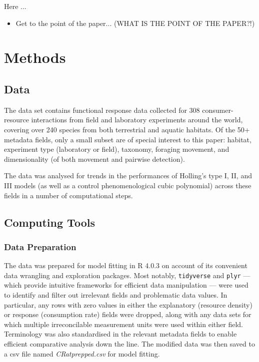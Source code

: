 \documentclass[11pt]{article}
\begin{document}
    Here ...
    \begin{itemize}
      \item Get to the point of the paper... (WHAT IS THE POINT OF THE PAPER?!)
    \end{itemize}
    
    \section{Methods}
    
    \subsection{Data}
    The data set contains functional response data collected for 308 consumer-resource interactions from field and laboratory experiments around the world, covering over 240 species from both terrestrial and aquatic habitats. Of the 50+ metadata fields, only a small subset are of special interest to this paper: habitat, experiment type (laboratory or field), taxonomy, foraging movement, and dimensionality (of both movement and pairwise detection).
    
    The data was analysed for trends in the performances of Holling's type I, II, and III models (as well as a control phenomenological cubic polynomial) across these fields in a number of computational steps.
    
    \subsection{Computing Tools}
    
    \subsubsection{Data Preparation}
    The data was prepared for model fitting in R 4.0.3 on account of its convenient data wrangling and exploration packages. Most notably, \texttt{tidyverse} and \texttt{plyr} — which provide intuitive frameworks for efficient data manipulation — were used to identify and filter out irrelevant fields and problematic data values. In particular, any rows with zero values in either the explanatory (resource density) or response (consumption rate) fields were dropped, along with any data sets for which multiple irreconcilable measurement units were used within either field. Terminology was also standardised in the relevant metadata fields to enable efficient comparative analysis down the line. The modified data was then saved to a csv file named \emph{CRatprepped.csv} for model fitting.
    
\end{document}
